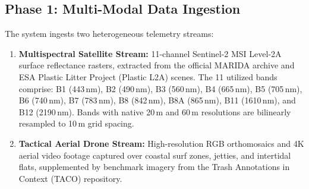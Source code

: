 \documentclass[conference]{IEEEtran}
\begin{document}
\subsection{Phase 1: Multi-Modal Data Ingestion}
The system ingests two heterogeneous telemetry streams:
\begin{enumerate}
    \item \textbf{Multispectral Satellite Stream:} 11-channel Sentinel-2 MSI Level-2A surface reflectance rasters, extracted from the official MARIDA archive and ESA Plastic Litter Project (Plastic L2A) scenes. The 11 utilized bands comprise: B1 (443\,nm), B2 (490\,nm), B3 (560\,nm), B4 (665\,nm), B5 (705\,nm), B6 (740\,nm), B7 (783\,nm), B8 (842\,nm), B8A (865\,nm), B11 (1610\,nm), and B12 (2190\,nm). Bands with native 20\,m and 60\,m resolutions are bilinearly resampled to 10\,m grid spacing.
    \item \textbf{Tactical Aerial Drone Stream:} High-resolution RGB orthomosaics and 4K aerial video footage captured over coastal surf zones, jetties, and intertidal flats, supplemented by benchmark imagery from the Trash Annotations in Context (TACO) repository.
\end{enumerate}
\end{document}

